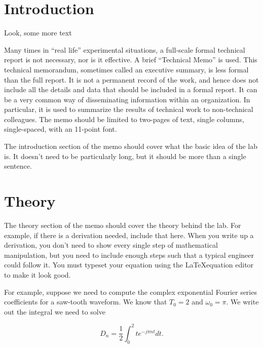 \documentclass[11pt]{texMemo-gibbons}
\begin{document}
\maketitle

\section{Introduction}
\label{sec:introduction}

Look, some more text

Many times in ``real life'' experimental situations,
a full-scale formal technical report is not necessary,
nor is it effective. A brief ``Technical Memo'' is used.
This technical memorandum, sometimes called an executive
summary, is less formal than the full report. It is
not a permanent record of the work, and hence does not
include all the details and data that should be included
in a formal report. It can be a very common way of disseminating
information within an organization. In particular, it
is used to summarize the results of technical work to
non-technical colleagues. The memo should be limited
to two-pages of text, single columns, single-spaced,
with an 11-point font.  

The introduction section of the memo should cover what
the basic idea of the lab is.  It doesn't need to be
particularly long, but it should be more than a single
sentence.  

\section{Theory}
\label{sec:theory}

The theory section of the memo should cover the theory
behind the lab.  For example, if there is a derivation
needed, include that here.  When you write up a derivation,
you don't need to show every single step of mathematical
manipulation, but you need to include enough steps such
that a typical engineer could follow it.  You must typeset
your equation using the \LaTeX  equation editor to make
it look good.

For example, suppose we need to compute the complex
exponential Fourier series coefficients for a saw-tooth
waveform.  We know that $T_0=2$ and $\omega_0=\pi$.
We write out the integral we need to solve

\begin{equation}
  \label{eq:1}
  D_n = \frac{1}{2}\int^2_0 t e^{-j\pi n t} dt.  
\end{equation}
\end{document}
